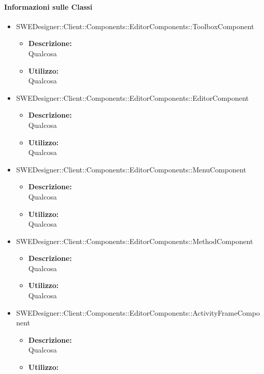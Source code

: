 		\paragraph{Informazioni sulle Classi}
		\begin{itemize}
			\item SWEDesigner::Client::Components::EditorComponents::ToolboxComponent
			\begin{itemize}
				\item \textbf{Descrizione: }\\
				Qualcosa
				\item \textbf{Utilizzo: }\\
				Qualcosa
			\end{itemize}
			\item SWEDesigner::Client::Components::EditorComponents::EditorComponent
			\begin{itemize}
				\item \textbf{Descrizione: }\\
				Qualcosa
				\item \textbf{Utilizzo: }\\
				Qualcosa
			\end{itemize}
			\item SWEDesigner::Client::Components::EditorComponents::MenuComponent
			\begin{itemize}
				\item \textbf{Descrizione: }\\
				Qualcosa
				\item \textbf{Utilizzo: }\\
				Qualcosa
			\end{itemize}
			\item SWEDesigner::Client::Components::EditorComponents::MethodComponent
			\begin{itemize}
				\item \textbf{Descrizione: }\\
				Qualcosa
				\item \textbf{Utilizzo: }\\
				Qualcosa
			\end{itemize}
			\item SWEDesigner::Client::Components::EditorComponents::ActivityFrameComponent
			\begin{itemize}
				\item \textbf{Descrizione: }\\
				Qualcosa
				\item \textbf{Utilizzo: }\\

\end{itemize}
\end{itemize}
